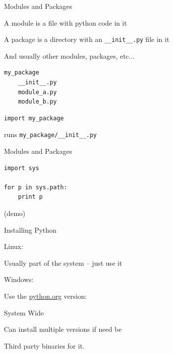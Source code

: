 \documentclass{beamer}
\begin{document}
\begin{frame}[fragile]{Modules and Packages}

\vfill
{\Large A module is a file with python code in it}

\vfill
{\Large A package is a directory with an \verb|__init__.py| file in it}

\vfill
{\Large And usually other modules, packages, etc...}

\begin{verbatim}
my_package
    __init__.py
    module_a.py
    module_b.py
\end{verbatim}

\begin{verbatim}
import my_package
\end{verbatim}

runs \verb|my_package/__init__.py|

\end{frame} 


\begin{frame}[fragile]{Modules and Packages}

\vfill
\begin{verbatim}
import sys

for p in sys.path:
    print p

\end{verbatim}

\vfill
(demo)
\end{frame} 

\begin{frame}[fragile]{Installing Python}

{\Large Linux:}

Usually part of the system -- just use it

\vfill
{\Large Windows:}

\vfill
Use the \url{python.org} version:

\vfill
System Wide

\vfill
Can install multiple versions if need be

\vfill
Third party binaries for it.

\end{frame} 
\end{document}
